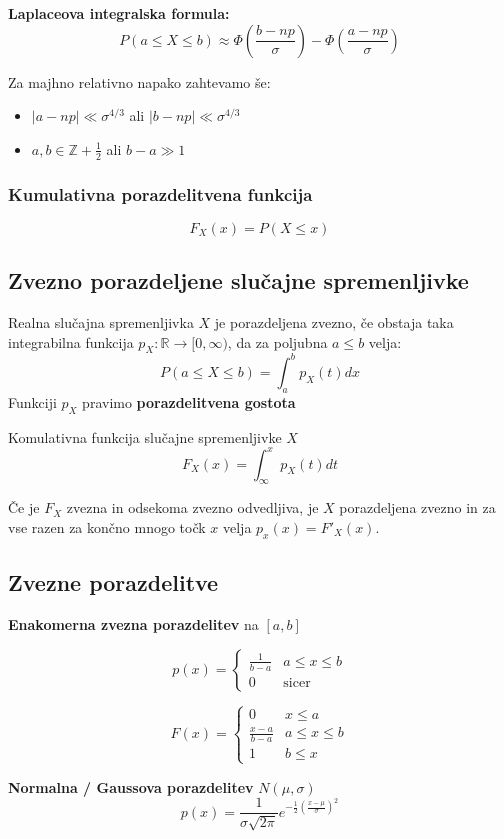 \begin{multicols}{5}
\textbf{Laplaceova integralska formula: }
\[ P(a \leq X \leq b) \approx \Phi\left( \frac{b - np}{\sigma} \right) - \Phi\left( \frac{a - np}{\sigma} \right) \]

Za majhno relativno napako zahtevamo še: 
\begin{itemize}
	\item $|a-np| \ll \sigma^{4/3}$ ali $|b-np| \ll \sigma^{4/3}$ 
	\item $a, b \in \mathbb{Z} + \frac{1}{2}$ ali $b - a \gg 1$
\end{itemize}

\subsubsection{Kumulativna porazdelitvena funkcija}
\[ F_X(x) = P(X \leq x)\]

\subsection{Zvezno porazdeljene slučajne spremenljivke}
Realna slučajna spremenljivka $X$ je porazdeljena zvezno, če obstaja taka integrabilna funkcija $p_X: \mathbb{R} \to [0, \infty)$, da za poljubna $a \leq b$ velja:
\[ P( a \leq X \leq b) = \int_a^b p_X(t) dx \]
Funkciji $p_X$ pravimo \textbf{porazdelitvena gostota}


Komulativna funkcija slučajne spremenljivke $X$
\[ F_X(x) = \int_{\infty}^x p_X(t) dt \]

Če je $F_X$ zvezna in odsekoma zvezno odvedljiva, je $X$ porazdeljena zvezno in za vse razen za končno mnogo točk $x$ velja $p_x(x) = F'_X(x)$.

\subsection{Zvezne porazdelitve}
\textbf{Enakomerna zvezna porazdelitev} na $ [a, b] $

\[ p(x) = \begin{cases}
	\frac{1}{b-a} & a \leq x \leq b \\
	0 & \text{sicer}
\end{cases}\]

\[ F(x) = \begin{cases}
	0 & x \leq a \\
	\frac{x-a}{b-a} & a \leq x \leq b \\
	1 & b \leq x
\end{cases}\]

\textbf{Normalna / Gaussova porazdelitev} $N(\mu, \sigma)$
\[ p(x) = \frac{1}{\sigma \sqrt{2\pi}} e^{-\frac{1}{2} \left( \frac{x-\mu}{\sigma} \right)^2}\]


\end{multicols}
